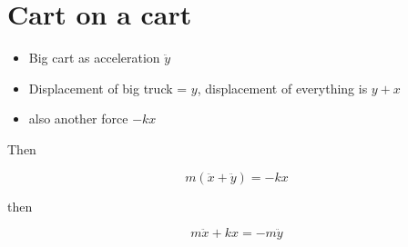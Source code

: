 \documentclass{article}
\newtheorem{one minute paper}[theorem]{One Minute Paper}
\begin{document}
\section*{Cart on a cart}

\begin{itemize}
    \item Big cart as acceleration $\ddot{y}$
    \item Displacement of big truck = $y$, displacement of everything is $y + x$
    \item also another force $-kx$
\end{itemize}

Then 

\begin{equation}
    m(\ddot{x} + \ddot{y}) = -kx
\end{equation}

then 

\begin{equation}
    m\ddot{x} + kx = -m\ddot{y}
\end{equation}
\end{document}
